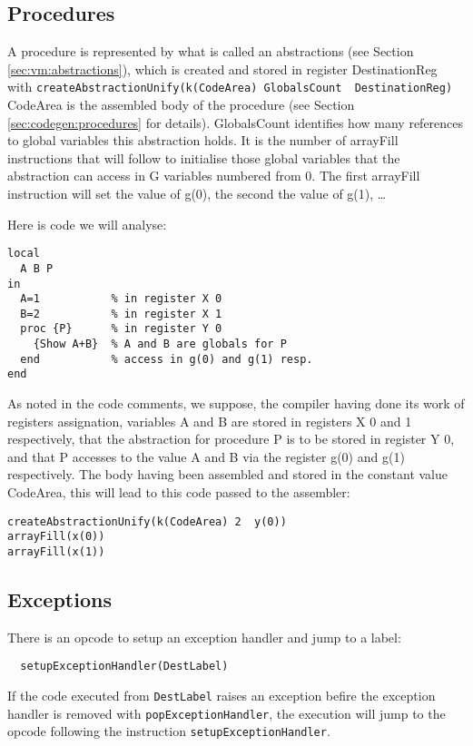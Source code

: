 \documentclass[a4paper]{memoir}
\begin{document}
\subsection{Procedures}\label{sec:opcode:procedures}
A procedure is represented by what is called an abstractions (see Section \ref{sec:vm:abstractions}), which is created and stored in register DestinationReg with
\lstinline!createAbstractionUnify(k(CodeArea) GlobalsCount  DestinationReg)!
CodeArea is the assembled body of the procedure (see Section \ref{sec:codegen:procedures} for details). GlobalsCount identifies how many references to global variables this abstraction holds. It is the number of arrayFill instructions that will follow to initialise those global variables that the abstraction can access in G variables numbered from 0. The first arrayFill instruction will set the value of g(0), the second the value of g(1), \ldots

Here is code we will analyse:

\begin{lstlisting}
local
  A B P
in
  A=1           % in register X 0
  B=2           % in register X 1
  proc {P}      % in register Y 0
    {Show A+B}  % A and B are globals for P
  end           % access in g(0) and g(1) resp.
end
\end{lstlisting}

As noted in the code comments, we suppose, the compiler having done its work of registers assignation, variables A and B are stored in registers X 0 and 1 respectively, that the abstraction for procedure P is to be stored in register Y 0, and that P accesses to the value A and B via the register g(0) and g(1) respectively.
The body having been assembled and stored in the constant value CodeArea, this will lead to this code passed to the assembler:
\begin{lstlisting}
createAbstractionUnify(k(CodeArea) 2  y(0))
arrayFill(x(0))
arrayFill(x(1))
\end{lstlisting}

\subsection{Exceptions}
There is an opcode to setup an exception handler and jump to a label:
\begin{lstlisting}
  setupExceptionHandler(DestLabel)
\end{lstlisting}
If the code executed from \lstinline!DestLabel! raises an exception befire  the exception handler
is removed with \lstinline!popExceptionHandler!, the execution will jump to the
opcode following the instruction \lstinline!setupExceptionHandler!.
\end{document}

